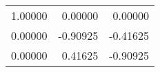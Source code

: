 \begin{tabular}{rrr}
\toprule
1.00000 &  0.00000 &  0.00000 \\
0.00000 & -0.90925 & -0.41625 \\
0.00000 &  0.41625 & -0.90925 \\
\bottomrule
\end{tabular}
